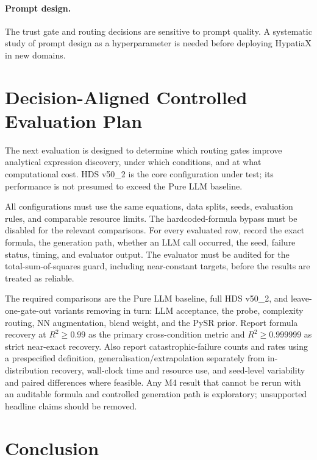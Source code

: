 \documentclass[twoside,11pt]{article}
\begin{document}
\paragraph{Prompt design.}
The trust gate and routing decisions are sensitive to prompt quality.  A systematic
study of prompt design as a hyperparameter is needed before deploying HypatiaX
in new domains.

\section{Decision-Aligned Controlled Evaluation Plan}
\label{sec:decision-aligned-evaluation}

The next evaluation is designed to determine which routing gates improve
analytical expression discovery, under which conditions, and at what
computational cost. HDS v50\_2 is the core configuration under test; its
performance is not presumed to exceed the Pure LLM baseline.

All configurations must use the same equations, data splits, seeds, evaluation
rules, and comparable resource limits. The hardcoded-formula bypass must be
disabled for the relevant comparisons. For every evaluated row, record the
exact formula, the generation path, whether an LLM call occurred, the seed,
failure status, timing, and evaluator output. The evaluator must be audited
for the total-sum-of-squares guard, including near-constant targets, before
the results are treated as reliable.

The required comparisons are the Pure LLM baseline, full HDS v50\_2, and
leave-one-gate-out variants removing in turn: LLM acceptance, the probe,
complexity routing, NN augmentation, blend weight, and the PySR prior.
Report formula recovery at $R^2 \geq 0.99$ as the primary cross-condition
metric and $R^2 \geq 0.999999$ as strict near-exact recovery. Also report
catastrophic-failure counts and rates using a prespecified definition,
generalisation/extrapolation separately from in-distribution recovery,
wall-clock time and resource use, and seed-level variability and paired
differences where feasible. Any M4 result that cannot be rerun with an
auditable formula and controlled generation path is exploratory; unsupported
headline claims should be removed.

\section{Conclusion}
\label{sec:conclusion}
\end{document}
